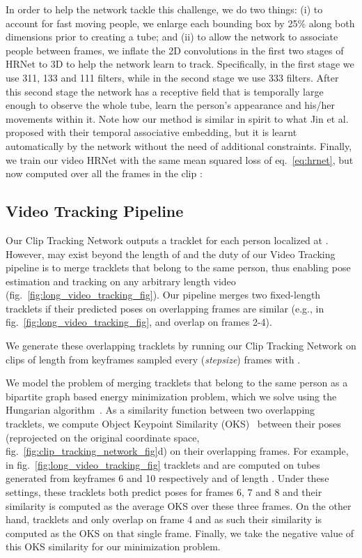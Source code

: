 \documentclass[10pt,twocolumn,letterpaper]{article}
\begin{document}
In order to help the network tackle this challenge, we do two things: (i) to account for fast moving people, we enlarge each bounding box by 25\% along both dimensions prior to creating a tube; and (ii) to allow the network to associate people between frames, we inflate the 2D convolutions in the first two stages of HRNet to 3D to help the network learn to track. Specifically, in the first stage 
we use {\small 311, 133 and 111} filters, while in the second stage we use {\small333} filters. After this second stage the network has a receptive field that is temporally large enough to observe the whole tube, learn the person's appearance and his/her movements within it. 
Note how our method is similar in spirit to what Jin et al.~\cite{jin2019multi} proposed with their temporal associative embedding, but it is learnt automatically by the network without the need of additional constraints. 
Finally, we train our video HRNet with the same mean squared loss of eq.~\ref{eq:hrnet}, but now computed over all the frames in the clip :





\subsection{Video Tracking Pipeline}\label{sec:tracking}

Our Clip Tracking Network outputs a tracklet   for each person  localized at . However,  may exist beyond the length of   and the duty of our Video Tracking pipeline is to merge tracklets that belong to the same person, thus enabling pose estimation and tracking on any arbitrary length video (fig.~\ref{fig:long_video_tracking_fig}). 
Our pipeline merges two fixed-length tracklets if their predicted poses on overlapping frames are similar (e.g., in fig.~\ref{fig:long_video_tracking_fig},  and  overlap on frames 2-4).

We generate these overlapping tracklets by running our Clip Tracking Network on clips of length  from keyframes sampled every  ({\it stepsize})  frames with . 

We model the problem of merging tracklets that belong to the same person as a bipartite graph based energy minimization problem, which we solve using the Hungarian algorithm~\cite{kuhn1955hungarian}.
As a similarity function between two overlapping tracklets, we compute Object Keypoint Similarity (OKS)~\cite{lin2014microsoft,ronchi17iccv} between their poses (reprojected on the original coordinate space, fig.~\ref{fig:clip_tracking_network_fig}{\color{red}d}) on their overlapping frames. For example, in fig.~\ref{fig:long_video_tracking_fig} tracklets {\small  and } are computed on tubes generated from keyframes 6 and 10 respectively and of length . Under these settings, these tracklets both predict poses for frames 6, 7 and 8 and their similarity is computed as the average OKS over these three frames. On the other hand, tracklets {\small  and } only overlap on frame 4 and as such their similarity is computed as the OKS on that single frame. Finally, we take the negative value of this OKS similarity for our minimization problem. 
\end{document}
